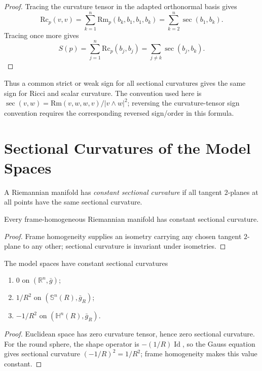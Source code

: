 \begin{proof}
\sketch
Tracing the curvature tensor in the adapted orthonormal basis gives
\[
\mathrm{Rc}_p(v,v)
=\sum_{k=1}^n\mathrm{Rm}_p(b_k,b_1,b_1,b_k)
=\sum_{k=2}^n\sec(b_1,b_k).
\]
Tracing once more gives
\[
S(p)=\sum_{j=1}^n\mathrm{Rc}_p(b_j,b_j)
=\sum_{j\ne k}\sec(b_j,b_k).
\]
\end{proof}

Thus a common strict or weak sign for all sectional curvatures gives the same
sign for Ricci and scalar curvature.  The convention used here is
$\sec(v,w)=\mathrm{Rm}(v,w,w,v)/|v\wedge w|^2$; reversing the curvature-tensor
sign convention requires the corresponding reversed sign/order in this
formula.

\section{Sectional Curvatures of the Model Spaces}

A Riemannian manifold has \emph{constant sectional curvature} if all tangent
$2$-planes at all points have the same sectional curvature.

\begin{lemma}
\label{lem:frame-homogeneous-constant-sectional-curvature}
Every frame-homogeneous Riemannian manifold has constant sectional curvature.
\end{lemma}

\begin{proof}
\sketch
Frame homogeneity supplies an isometry carrying any chosen tangent $2$-plane
to any other; sectional curvature is invariant under isometries.
\end{proof}

\begin{theorem}
\label{thm:sectional-curvatures-model-spaces}
The model spaces have constant sectional curvatures
\begin{enumerate}
\item[(a)] $0$ on $(\mathbb R^n,\bar g)$;
\item[(b)] $1/R^2$ on $(\mathbb S^n(R),\bar g_R)$;
\item[(c)] $-1/R^2$ on $(\mathbb H^n(R),\bar g_R)$.
\end{enumerate}
\end{theorem}

\begin{proof}
\sketch
Euclidean space has zero curvature tensor, hence zero sectional curvature.
For the round sphere, the shape operator is $-(1/R)\operatorname{Id}$, so the
Gauss equation gives sectional curvature $(-1/R)^2=1/R^2$; frame homogeneity
makes this value constant.
\end{proof}

